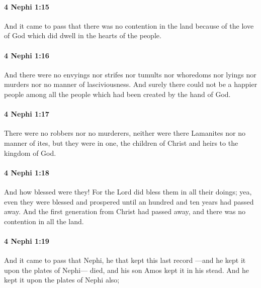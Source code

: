 		\paragraph{4 Nephi 1:15} %
			\label{4NEPHI-1-15}

			And it came to pass that there was no contention in the land
			because of the love of God which did dwell in the hearts of the people.

		\paragraph{4 Nephi 1:16} %
			\label{4NEPHI-1-16}

			And there were no envyings nor strifes nor tumults nor whoredoms
			nor lyings nor murders nor no manner of lasciviousness.
			And surely there could not be a happier people
			among all the people which had been created by the hand of God.

		\paragraph{4 Nephi 1:17} %
			\label{4NEPHI-1-17}

			There were no robbers nor no murderers,
			neither were there Lamanites nor no manner of ites,
			but they were in one,
			the children of Christ and heirs to the kingdom of God.

		\paragraph{4 Nephi 1:18} %
			\label{4NEPHI-1-18}

			And how blessed were they!
			For the Lord did bless them in all their doings;
			yea, even they were blessed and prospered
			until an hundred and ten years had passed away.
			And the first generation from Christ had passed away,
			and there was no contention in all the land.

		\paragraph{4 Nephi 1:19} %
			\label{4NEPHI-1-19}

			And it came to pass that Nephi,
			he that kept this last record
			—and he kept it upon the plates of Nephi—
			died, and his son Amos kept it in his stead.
			And he kept it upon the plates of Nephi also;

